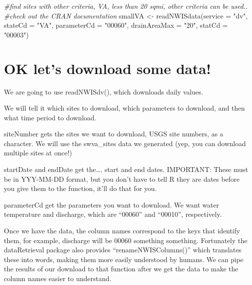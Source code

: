 \documentclass[
]{book}
\newenvironment{Shaded}{\begin{snugshade}}{\end{snugshade}}
\newcommand{\AttributeTok}[1]{\textcolor[rgb]{0.77,0.63,0.00}{#1}}
\newcommand{\CommentTok}[1]{\textcolor[rgb]{0.56,0.35,0.01}{\textit{#1}}}
\newcommand{\FunctionTok}[1]{\textcolor[rgb]{0.00,0.00,0.00}{#1}}
\newcommand{\NormalTok}[1]{#1}
\newcommand{\OtherTok}[1]{\textcolor[rgb]{0.56,0.35,0.01}{#1}}
\newcommand{\StringTok}[1]{\textcolor[rgb]{0.31,0.60,0.02}{#1}}
\begin{document}
\begin{Shaded}
\begin{Highlighting}[]
\CommentTok{\#find sites with other criteria, VA, less than 20 sqmi, other criteria can be used..}
\CommentTok{\#check out the CRAN documentation}
\NormalTok{smallVA }\OtherTok{\textless{}{-}} \FunctionTok{readNWISdata}\NormalTok{(}\AttributeTok{service =} \StringTok{"dv"}\NormalTok{,}
                           \AttributeTok{stateCd =} \StringTok{"VA"}\NormalTok{,}
                           \AttributeTok{parameterCd =} \StringTok{"00060"}\NormalTok{,}
                           \AttributeTok{drainAreaMax =} \StringTok{"20"}\NormalTok{,}
                           \AttributeTok{statCd =} \StringTok{"00003"}\NormalTok{)}
\end{Highlighting}
\end{Shaded}

\hypertarget{ok-lets-download-some-data}{%
\section{OK let's download some data!}\label{ok-lets-download-some-data}}

We are going to use readNWISdv(), which downloads daily values.

We will tell it which sites to download, which parameters to download, and then what time period to download.

siteNumber gets the sites we want to download, USGS site numbers, as a character. We will use the swva\_sites data we generated (yep, you can download multiple sites at once!)

startDate and endDate get the\ldots. start and end dates. IMPORTANT: These must be in YYY-MM-DD format, but you don't have to tell R they are dates before you give them to the function, it'll do that for you.

parameterCd get the parameters you want to download. We want water temperature and discharge, which are ``00060'' and ``00010'', respectively.

Once we have the data, the column names correspond to the keys that identify them, for example, discharge will be 00060 something something. Fortunately the dataRetrieval package also provides ``renameNWISColumns()'' which translates these into words, making them more easily understood by humans. We can pipe the results of our download to that function after we get the data to make the column names easier to understand.
\end{document}
